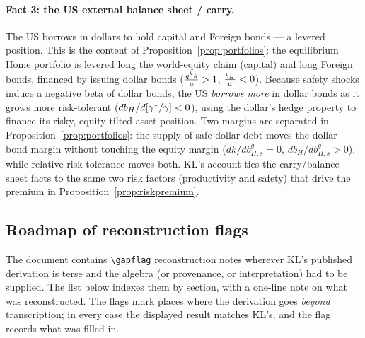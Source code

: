 \paragraph{Fact 3: the US external balance sheet / carry.} The US borrows in
dollars to hold capital and Foreign bonds --- a levered position. This is the
content of Proposition~\ref{prop:portfolios}: the equilibrium Home portfolio is
levered long the world-equity claim (capital) and long Foreign bonds, financed by
issuing dollar bonds ($\frac{q^{k} k}{a}>1$, $\frac{b_H}{a}<0$). Because safety
shocks induce a negative beta of dollar bonds, the US \emph{borrows more} in dollar
bonds as it grows more risk-tolerant ($db_H/d[\gamma^{*}/\gamma]<0$), using the dollar's
hedge property to finance its risky, equity-tilted asset position. Two margins are
separated in Proposition~\ref{prop:portfolios}: the supply of safe dollar debt
moves the dollar-bond margin without touching the equity margin
($dk/db^g_{H,s}=0$, $db_H/db^g_{H,s}>0$), while relative risk tolerance moves both.
KL's account ties the carry/balance-sheet facts to the same two risk factors
(productivity and safety) that drive the premium in
Proposition~\ref{prop:riskpremium}.

\subsection{Roadmap of reconstruction flags}
\label{sec:flag-roadmap}

The document contains \texttt{\textbackslash gapflag} reconstruction notes
wherever KL's published derivation is terse and the algebra (or provenance, or
interpretation) had to be supplied. The list below indexes them by section, with a
one-line note on what was reconstructed. The flags mark places where the
derivation goes \emph{beyond} transcription; in every case the displayed result
matches KL's, and the flag records what was filled in.

